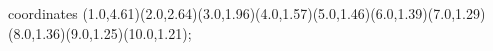 					coordinates { (1.0,4.61)(2.0,2.64)(3.0,1.96)(4.0,1.57)(5.0,1.46)(6.0,1.39)(7.0,1.29)(8.0,1.36)(9.0,1.25)(10.0,1.21)};